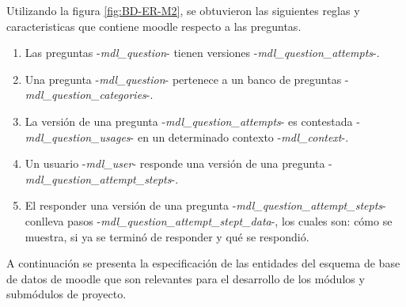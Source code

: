 \clearpage




\noindent Utilizando la figura \ref{fig:BD-ER-M2}, se obtuvieron las siguientes reglas y caracteristicas que contiene moodle respecto a las preguntas.
\begin{enumerate}
    \item Las preguntas -{\it mdl\_question}- tienen versiones -{\it mdl\_question\_attempts}-.
    \item Una pregunta -{\it mdl\_question}- pertenece a un banco de preguntas -{\it mdl\_question\_categories}-.
    \item La versión de una pregunta -{\it mdl\_question\_attempts}- es contestada -{\it mdl\_question\_usages}- en un determinado contexto -{\it mdl\_context}-.
    \item Un usuario -{\it mdl\_user}- responde una versión de una pregunta -{\it mdl\_question\_attempt\_stepts}-.
    \item El responder una versión de una pregunta -{\it mdl\_question\_attempt\_stepts}- conlleva pasos -{\it mdl\_question\_attempt\_stept\_data}-, los cuales son: cómo se muestra, si ya se terminó de responder y qué se respondió.
\end{enumerate}


 A continuación se presenta la especificación de las entidades del esquema de base
 de datos de moodle que son relevantes para el desarrollo de los módulos y submódulos
 de proyecto.

